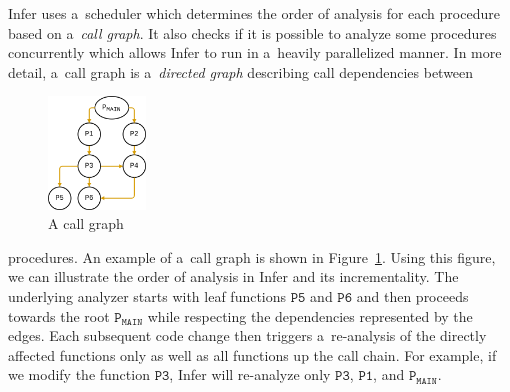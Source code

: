 \documentclass{ExcelAtFIT}
\begin{document}



Infer uses a~scheduler which determines the order of
analysis for each procedure based on a~\textit{call graph}.
It also checks if it is possible to analyze some procedures
concurrently which allows Infer to run in a~heavily
parallelized manner.
In more detail, a~call graph is a~\emph{directed graph}
describing call dependencies between
\begin{figure}
    \centering
    \includegraphics[width=0.23\textwidth]{images/infer/callgraph.png}
    \caption{A call graph}
    \label{fig:infer-callgraph}
\end{figure}
procedures. An example of a~call graph is shown in
Figure~\ref{fig:infer-callgraph}. Using this figure, we can illustrate
the order of analysis in Infer and its incrementality.
The underlying analyzer starts with leaf functions $\mathtt{P5}$
and $\mathtt{P6}$
and then proceeds
towards the root $\mathtt{P_{MAIN}}$ while respecting
the dependencies represented by the edges.
Each subsequent code change then triggers
a~re-analysis of the directly affected functions only
as well as all functions up the call chain. For example,
if we modify the function $\mathtt{P3}$, Infer
will re-analyze only $\mathtt{P3}$,
$\mathtt{P1}$, and $\mathtt{P_{MAIN}}$.
\end{document}
